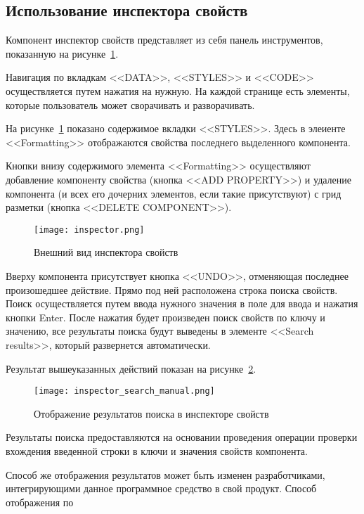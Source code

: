 \subsection{Использование инспектора свойств}
\label{sec:manual:inspector_manual}

Компонент инспектор свойств представляет из себя панель инструментов, показанную на рисунке~\ref{sec:manual:inspector}.

Навигация по вкладкам <<DATA>>, <<STYLES>> и <<CODE>> осуществляется путем нажатия на нужную. На каждой странице есть элементы, которые пользователь может сворачивать и разворачивать.

На рисунке~\ref{sec:manual:inspector} показано содержимое вкладки <<STYLES>>. Здесь в элеиенте <<Formatting>> отображаются свойства последнего выделенного компонента.

Кнопки внизу содержимого элемента <<Formatting>> осуществляют добавление компоненту свойства (кнопка <<ADD PROPERTY>>) и удаление компонента (и всех его дочерних элементов, если такие присутствуют) с грид разметки (кнопка <<DELETE COMPONENT>>).

\begin{figure}[ht]
  \centering
    \texttt{[image: inspector.png]}
    \caption{Внешний вид инспектора свойств}
    \label{sec:manual:inspector}
\end{figure}
  
Вверху компонента присутствует кнопка <<UNDO>>, отменяющая последнее произошедшее действие. Прямо под ней расположена строка поиска свойств. Поиск осуществляется путем ввода нужного значения в поле для ввода и нажатия кнопки Enter. После нажатия будет произведен поиск свойств по ключу и значению, все результаты поиска будут выведены в элементе <<Search results>>, который развернется автоматически.

Результат вышеуказанных действий показан на рисунке~\ref{sec:manual:inspector_search_manual}.\pagebreak

\begin{figure}[ht]
  \centering
    \texttt{[image: inspector\_search\_manual.png]}
    \caption{Отображение результатов поиска в инспекторе свойств}
    \label{sec:manual:inspector_search_manual}
\end{figure}

Результаты поиска предоставляются на основании проведения операции проверки вхождения введенной строки в ключи и значения свойств компонента. 

Способ же отображения результатов может быть изменен разработчиками, интегрирующими данное программное средство в свой продукт. Способ отображения по 

